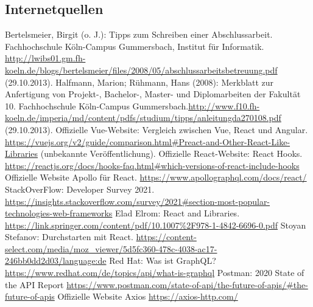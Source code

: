      \subsection{Internetquellen}
     \begin{thebibliography}{2} %
       Bertelsmeier, Birgit (o. J.): Tipps zum Schrei\-b\-en ei\-n\-er Ab\-sch\-luss\-ar\-beit. Fach\-hoch\-schu\-le Köln-Campus Gummersbach, Institut für Informatik. \url{http://lwibs01.gm.fh-koeln.de/blogs/bertelsmeier/files/2008/05/abschlussarbeitsbetreuung.pdf} (29.10.2013).
         Halfmann, Marion; Rühmann, Hans (2008): Merkblatt zur Anfertigung von Projekt-, Bachelor-, Master- und Diplomarbeiten der Fakultät 10. Fachhochschule Köln-Campus Gummersbach.\url{http://www.f10.fh-koeln.de/imperia/md/content/pdfs/studium/tipps/anleitungda270108.pdf} (29.10.2013).
         Offizielle Vue-Website: Vergleich zwischen Vue, React und Angular. \url{https://vuejs.org/v2/guide/comparison.html#Preact-and-Other-React-Like-Libraries} (unbekannte Veröffentlichung).
        Offizielle React-Website: React Hooks. \url{https://reactjs.org/docs/hooks-faq.html#which-versions-of-react-include-hooks}
        Offizielle Website Apollo für React. \url{https://www.apollographql.com/docs/react/}
        StackOverFlow: Developer Survey 2021. \url{https://insights.stackoverflow.com/survey/2021#section-most-popular-technologies-web-frameworks}
        Elad Elrom: React and Libraries. \url{https://link.springer.com/content/pdf/10.1007%2F978-1-4842-6696-0.pdf}
        Stoyan Stefanov: Durchstarten mit React. \url{https://content-select.com/media/moz_viewer/5d5fc360-478c-4038-ac17-246bb0dd2d03/language:de}
        Red Hat: Was ist GraphQL? \url{https://www.redhat.com/de/topics/api/what-is-graphql}
        Postman: 2020 State of the API Report \url{https://www.postman.com/state-of-api/the-future-of-apis/#the-future-of-apis}
        Offizielle Website Axios \url{https://axios-http.com/}



\end{thebibliography}
